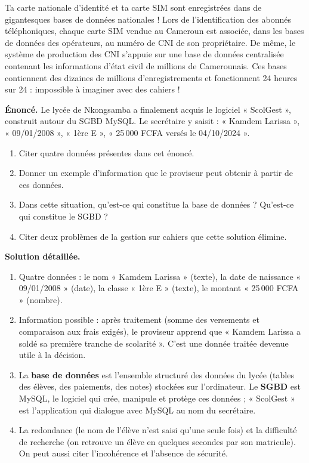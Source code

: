 \documentclass[11pt]{article}
\newcounter{popsec}
\newcounter{popsub}
\newcommand{\courssub}[1]{%
  \stepcounter{popsub}%
  \par\vspace{9pt}\noindent{\popxbold\fontsize{11.5}{13}\selectfont\color{popink}{\color{poporange}\thepopsec.\thepopsub}\hspace{6pt}#1}\par\nopagebreak\vspace{4pt}
}
\begin{document}
\begin{savaistu}
Ta carte nationale d'identité et ta carte SIM sont enregistrées dans de gigantesques bases de données nationales ! Lors de l'identification des abonnés téléphoniques, chaque carte SIM vendue au Cameroun est associée, dans les bases de données des opérateurs, au numéro de CNI de son propriétaire. De même, le système de production des CNI s'appuie sur une base de données centralisée contenant les informations d'état civil de millions de Camerounais. Ces bases contiennent des dizaines de millions d'enregistrements et fonctionnent 24 heures sur 24 : impossible à imaginer avec des cahiers !
\end{savaistu}

\courssub{Exercice résolu et synthèse}

\begin{exoresolu}
\textbf{Énoncé.} Le lycée de Nkongsamba a finalement acquis le logiciel « ScolGest », construit autour du SGBD MySQL. Le secrétaire y saisit : « Kamdem Larissa », « 09/01/2008 », « 1ère E », « 25\,000 FCFA versés le 04/10/2024 ».
\begin{enumerate}
  \item Citer quatre données présentes dans cet énoncé.
  \item Donner un exemple d'information que le proviseur peut obtenir à partir de ces données.
  \item Dans cette situation, qu'est-ce qui constitue la base de données ? Qu'est-ce qui constitue le SGBD ?
  \item Citer deux problèmes de la gestion sur cahiers que cette solution élimine.
\end{enumerate}
\tcblower
\textbf{Solution détaillée.}
\begin{enumerate}
  \item Quatre données : le nom « Kamdem Larissa » (texte), la date de naissance « 09/01/2008 » (date), la classe « 1ère E » (texte), le montant « 25\,000 FCFA » (nombre).
  \item Information possible : après traitement (somme des versements et comparaison aux frais exigés), le proviseur apprend que « Kamdem Larissa a soldé sa première tranche de scolarité ». C'est une donnée traitée devenue utile à la décision.
  \item La \textbf{base de données} est l'ensemble structuré des données du lycée (tables des élèves, des paiements, des notes) stockées sur l'ordinateur. Le \textbf{SGBD} est MySQL, le logiciel qui crée, manipule et protège ces données ; « ScolGest » est l'application qui dialogue avec MySQL au nom du secrétaire.
  \item La redondance (le nom de l'élève n'est saisi qu'une seule fois) et la difficulté de recherche (on retrouve un élève en quelques secondes par son matricule). On peut aussi citer l'incohérence et l'absence de sécurité.
\end{enumerate}
\end{exoresolu}
\end{document}
